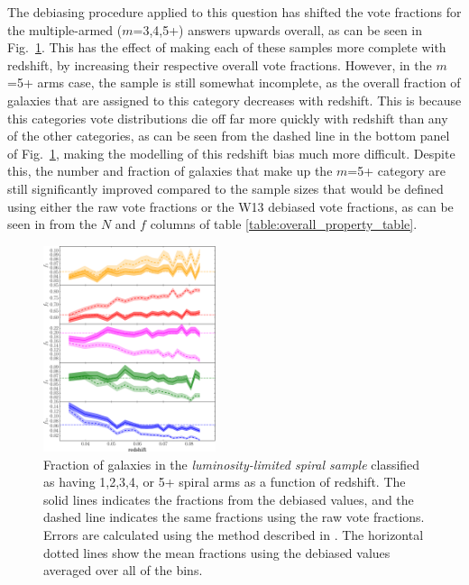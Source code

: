 \documentclass[useAMS,usenatbib]{mn2e}
\begin{document}
The debiasing procedure applied to this question has shifted the vote fractions for the multiple-armed ($m$=3,4,5+) answers upwards overall, as can be seen in Fig.~\ref{fig:arm_number_trend}. This has the effect of making each of these samples more complete with redshift, by increasing their respective overall vote fractions. However, in the $m$=5+ arms case, the sample is still somewhat incomplete, as the overall fraction of galaxies that are assigned to this category decreases with redshift. This is because this categories vote distributions die off far more quickly with redshift than any of the other categories, as can be seen from the dashed line in the bottom panel of Fig.~\ref{fig:arm_number_trend}, making the  modelling of this redshift bias much more difficult. Despite this, the number and fraction of galaxies that make up the $m$=5+ category are still significantly improved compared to the sample sizes that would be defined using either the raw vote fractions or the W13 debiased vote fractions, as can be seen in from the $N$ and $f$ columns of table \ref{table:overall_property_table}. 

\begin{figure}
		\centering

        \includegraphics[width=0.45\textwidth]{Images/Results/sample_fractions.pdf}

        \caption{Fraction of galaxies in the \textit{luminosity-limited spiral sample} classified as having 1,2,3,4, or 5+ spiral arms as a function of redshift. The solid lines indicates the fractions from the debiased values, and the dashed line indicates the same fractions using the raw vote fractions. Errors are calculated using the method described in \citet{Cameron_11}. The horizontal dotted lines show the mean fractions using the debiased values averaged over all of the bins.}

        \label{fig:arm_number_trend}

\end{figure}
\end{document}

